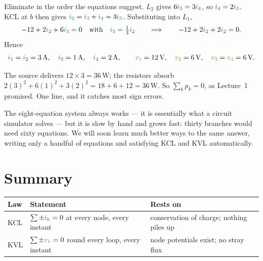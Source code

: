 \documentclass[11pt,a4paper]{article}
\newcommand{\Icol}[1]{\textcolor{ccur}{#1}}
\newcommand{\Vcol}[1]{\textcolor{cvolt}{#1}}
\newcommand{\Pcol}[1]{\textcolor{cpow}{#1}}
\newcommand{\uni}[1]{\,\mathrm{#1}}
\newcommand{\A}{\uni{A}}   \newcommand{\V}{\uni{V}}
\newcommand{\W}{\uni{W}}   \newcommand{\J}{\uni{J}}
\begin{document}
Eliminate in the order the equations suggest. $L_2$ gives $6\Icol{i_3} = 3\Icol{i_4}$, so
$\Icol{i_4} = 2\Icol{i_3}$. KCL at $b$ then gives $\Icol{i_2} = \Icol{i_3} + \Icol{i_4}
= 3\Icol{i_3}$. Substituting into $L_1$,
\[
  -12 + 2\Icol{i_2} + 6\Icol{i_3} = 0
  \quad\text{with}\quad \Icol{i_3} = \tfrac13\Icol{i_2}
  \qquad\Longrightarrow\qquad
  -12 + 2\Icol{i_2} + 2\Icol{i_2} = 0 .
\]
Hence
\[
  \Icol{i_1} = \Icol{i_2} = 3\A, \quad \Icol{i_3} = 1\A, \quad \Icol{i_4} = 2\A,
  \qquad
  \Vcol{v_1} = 12\V, \quad \Vcol{v_2} = 6\V, \quad \Vcol{v_3} = \Vcol{v_4} = 6\V .
\]

\begin{ideabox}
The source delivers $12 \times 3 = 36\W$; the resistors absorb
$2(3)^2 + 6(1)^2 + 3(2)^2 = 18 + 6 + 12 = 36\W$. So \Pcol{$\sum_k p_k = 0$}, as Lecture~1
promised. One line, and it catches most sign errors.
\end{ideabox}

The eight-equation system always works --- it is essentially what a circuit simulator
solves --- but it is slow by hand and grows fast: thirty branches would need sixty
equations. We will soon learn much better ways to the same answer, writing only a handful
of equations and satisfying KCL and KVL automatically.

\section*{Summary}

\begin{center}
\small
\begin{tabular}{@{}l l l@{}}
\toprule
\textbf{Law} & \textbf{Statement} & \textbf{Rests on}\\
\midrule
KCL & $\sum \pm \Icol{i_k} = 0$ at every node, every instant
    & conservation of charge; nothing piles up\\
KVL & $\sum \pm \Vcol{v_k} = 0$ round every loop, every instant
    & node potentials exist; no stray flux\\
\bottomrule
\end{tabular}
\end{center}
\end{document}
